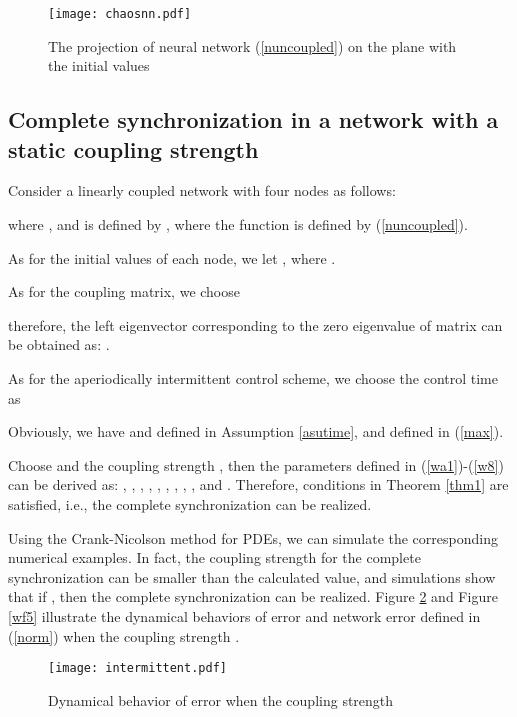 \documentclass[review]{elsarticle}
\begin{document}
\begin{figure}
\begin{center}
\texttt{[image: chaosnn.pdf]}
\end{center}
\caption{The projection of neural network (\ref{nuncoupled}) on the plane  with the initial values }\label{wf3}
\end{figure}

\subsection{Complete synchronization in a network with a static coupling strength}\label{n-static}
Consider a linearly coupled network with four nodes as follows:

where , and  is defined by ,
where the function  is defined by (\ref{nuncoupled}).

As for the initial values of each node, we let , where .

As for the coupling matrix, we choose

therefore, the left eigenvector  corresponding to the zero eigenvalue of matrix  can be obtained as:
.

As for the aperiodically intermittent control scheme, we choose the control time as

Obviously, we have  and  defined in Assumption \ref{asutime}, and  defined in (\ref{max}).

Choose  and the coupling strength , then the parameters defined in (\ref{wa1})-(\ref{w8}) can be derived as: , , , , , , , , , and . Therefore, conditions in Theorem \ref{thm1} are satisfied, i.e., the complete synchronization can be realized.

Using the Crank-Nicolson method for PDEs, we can simulate the corresponding numerical examples. In fact, the coupling strength for the complete synchronization can be smaller than the calculated value, and simulations show that if , then the complete synchronization can be realized. Figure \ref{wf4} and Figure \ref{wf5} illustrate the dynamical behaviors of error  and network error  defined in (\ref{norm}) when the coupling strength .

\begin{figure}
\begin{center}
\texttt{[image: intermittent.pdf]}
\end{center}
\caption{Dynamical behavior of error  when the coupling strength }\label{wf4}
\end{figure}
\end{document}
